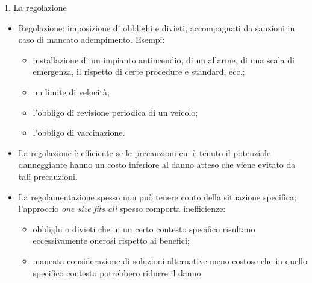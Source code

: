 \documentclass[aspectratio=64,12pt]{beamer}
\begin{document}
\begin{frame}{1. La regolazione}
\begin{itemize}
\item \alert{Regolazione}: imposizione di obblighi e divieti, accompagnati da sanzioni in
caso di mancato adempimento. Esempi:
\begin{itemize}
\item installazione di un impianto antincendio, di un allarme, di una scala di
emergenza, il rispetto di certe procedure e standard, ecc.;
\item un limite di velocità;
\item l’obbligo di revisione periodica di un veicolo;
\item l’obbligo di vaccinazione.
\end{itemize}
\item La regolazione è \alert{efficiente} se le precauzioni cui è tenuto il potenziale
danneggiante hanno un costo inferiore al danno atteso che viene evitato da tali precauzioni.
\item La regolamentazione spesso non può tenere conto della situazione
specifica; l'approccio \emph{one size fits all} spesso comporta inefficienze:
\begin{itemize}
\item obblighi o divieti che in un certo contesto specifico risultano
eccessivamente onerosi rispetto ai benefici;
\item mancata considerazione di soluzioni alternative meno costose che in quello
specifico contesto potrebbero ridurre il danno.
\end{itemize}
\end{itemize}
\end{frame}
\end{document}
